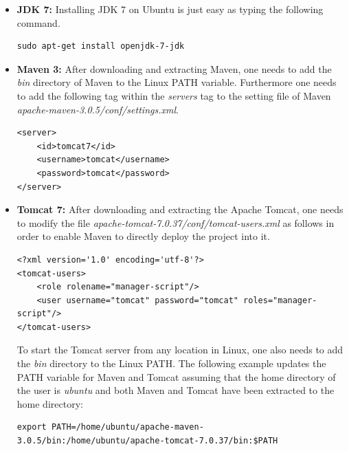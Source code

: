 \begin{itemize}
\item{\textbf{\ac{JDK} 7:}} Installing  \ac{JDK} 7 on Ubuntu is just easy as typing the following command.%
\begin{code}
\begin{verbatim}
sudo apt-get install openjdk-7-jdk
\end{verbatim}
\end{code}

\item{\textbf{Maven 3:}}  After downloading and extracting Maven, one needs to add the \textit{bin} directory of Maven to the Linux PATH variable. Furthermore one needs to add the following tag within the \textit{servers} tag to the setting file of Maven \textit{apache-maven-3.0.5/conf/settings.xml}.
\begin{code}
\begin{verbatim}
<server>
	<id>tomcat7</id>
	<username>tomcat</username>
	<password>tomcat</password>
</server>
\end{verbatim}
\end{code}

\item{\textbf{Tomcat 7:}} After downloading and extracting the Apache Tomcat, one needs to modify the file \textit{apache-tomcat-7.0.37/conf/tomcat-users.xml} as follows in order to enable Maven to directly deploy the project into it. 
\begin{code}
\begin{verbatim}
<?xml version='1.0' encoding='utf-8'?>
<tomcat-users>
	<role rolename="manager-script"/>
	<user username="tomcat" password="tomcat" roles="manager-script"/>
</tomcat-users>
\end{verbatim}
\end{code}

To start the Tomcat server from any location in Linux, one also needs to add the \textit{bin} directory to the Linux PATH. The following example updates the PATH variable for Maven and Tomcat assuming that the home directory of the user is \textit{ubuntu} and both Maven and Tomcat have been extracted to the home directory:

\begin{code}
\begin{verbatim}
export PATH=/home/ubuntu/apache-maven-3.0.5/bin:/home/ubuntu/apache-tomcat-7.0.37/bin:$PATH
\end{verbatim}
\end{code}


\end{itemize}
